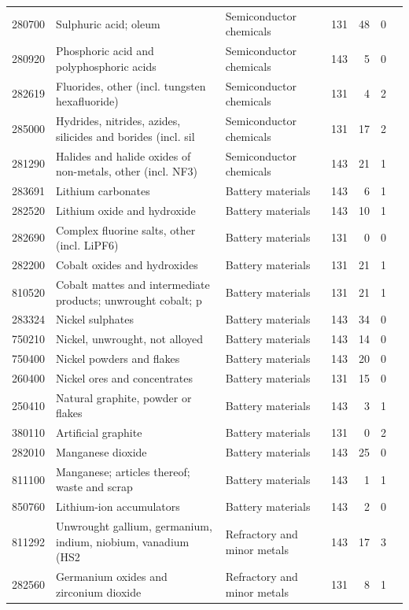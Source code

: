 \documentclass[10pt,a4paper]{article}
\begin{document}
\begin{minipage}{\linewidth}
\begin{tabular}{llp{3.2cm}rrrl}
280700 & Sulphuric acid; oleum & Semiconductor chemicals & 131 & 48 & 0 &  \\
280920 & Phosphoric acid and polyphosphoric acids & Semiconductor chemicals & 143 & 5 & 0 &  \\
282619 & Fluorides, other (incl. tungsten hexafluoride) & Semiconductor chemicals & 131 & 4 & 2 &  \\
285000 & Hydrides, nitrides, azides, silicides and borides (incl. sil & Semiconductor chemicals & 131 & 17 & 2 &  \\
281290 & Halides and halide oxides of non-metals, other (incl. NF3) & Semiconductor chemicals & 143 & 21 & 1 &  \\
283691 & Lithium carbonates & Battery materials & 143 & 6 & 1 &  \\
282520 & Lithium oxide and hydroxide & Battery materials & 143 & 10 & 1 &  \\
282690 & Complex fluorine salts, other (incl. LiPF6) & Battery materials & 131 & 0 & 0 &  \\
282200 & Cobalt oxides and hydroxides & Battery materials & 131 & 21 & 1 &  \\
810520 & Cobalt mattes and intermediate products; unwrought cobalt; p & Battery materials & 131 & 21 & 1 &  \\
283324 & Nickel sulphates & Battery materials & 143 & 34 & 0 &  \\
750210 & Nickel, unwrought, not alloyed & Battery materials & 143 & 14 & 0 &  \\
750400 & Nickel powders and flakes & Battery materials & 143 & 20 & 0 &  \\
260400 & Nickel ores and concentrates & Battery materials & 131 & 15 & 0 &  \\
250410 & Natural graphite, powder or flakes & Battery materials & 143 & 3 & 1 &  \\
380110 & Artificial graphite & Battery materials & 131 & 0 & 2 &  \\
282010 & Manganese dioxide & Battery materials & 143 & 25 & 0 &  \\
811100 & Manganese; articles thereof; waste and scrap & Battery materials & 143 & 1 & 1 &  \\
850760 & Lithium-ion accumulators & Battery materials & 143 & 2 & 0 &  \\
811292 & Unwrought gallium, germanium, indium, niobium, vanadium (HS2 & Refractory and minor metals & 143 & 17 & 3 &  \\
282560 & Germanium oxides and zirconium dioxide & Refractory and minor metals & 131 & 8 & 1 &  \\

\end{tabular}
\end{minipage}
\end{document}
